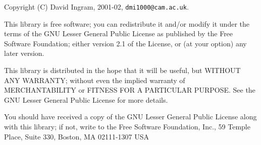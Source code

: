 \documentclass[12pt,a4paper,twoside]{article}
\renewcommand{\_}{\texttt{\symbol{95}}}
\begin{document}
Copyright (C) David Ingram, 2001-02, \texttt{dmi1000@cam.ac.uk}.

This library is free software; you can redistribute it and/or
modify it under the terms of the GNU Lesser General Public
License as published by the Free Software Foundation; either
version 2.1 of the License, or (at your option) any later version.

This library is distributed in the hope that it will be useful,
but WITHOUT ANY WARRANTY; without even the implied warranty of
MERCHANTABILITY or FITNESS FOR A PARTICULAR PURPOSE.  See the GNU
Lesser General Public License for more details.

You should have received a copy of the GNU Lesser General Public
License along with this library; if not, write to the Free Software
Foundation, Inc., 59 Temple Place, Suite 330, Boston, MA  02111-1307  USA
\end{document}
